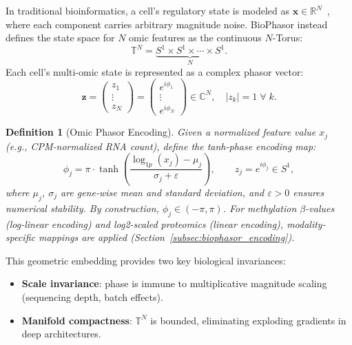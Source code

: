 \documentclass[preprint,12pt,amsmath,amssymb,superscriptaddress,floatfix]{revtex4-2}
\newcommand{\reals}{\mathbb{R}}
\newcommand{\complex}{\mathbb{C}}
\newtheorem{definition}{Definition}[section]
\newcommand{\torus}{\mathbb{T}}
\begin{document}
In traditional bioinformatics, a cell's regulatory state is modeled as
$\boldsymbol{x} \in \reals^N$~\cite{ref_051,ref_052,ref_053,ref_054,ref_055},
where each component carries arbitrary magnitude noise.
BioPhasor instead defines the state space for $N$ omic features as the
continuous $N$-Torus:
\begin{equation}
    \torus^N = \underbrace{S^1 \times S^1 \times \cdots \times S^1}_{N}.
\end{equation}
Each cell's multi-omic state is represented as a complex phasor vector:
\begin{equation}
    \boldsymbol{z} = \begin{pmatrix} z_1 \\ \vdots \\ z_N \end{pmatrix}
    = \begin{pmatrix} e^{i\phi_1} \\ \vdots \\ e^{i\phi_N} \end{pmatrix}
    \in \complex^N, \quad |z_k| = 1 \;\forall\; k.
\end{equation}

\begin{definition}[Omic Phasor Encoding]
\label{def:encoding}
Given a normalized feature value $x_j$ (e.g., CPM-normalized RNA count),
define the tanh-phase encoding map:
\begin{equation}
    \phi_j = \pi \cdot \tanh\!\left(\frac{\log_{1p}(x_j) - \mu_j}
    {\sigma_j + \varepsilon}\right),
    \qquad z_j = e^{i\phi_j} \in S^1,
\end{equation}
where $\mu_j$, $\sigma_j$ are gene-wise mean and standard deviation, and
$\varepsilon > 0$ ensures numerical stability.
By construction, $\phi_j \in (-\pi, \pi)$.
For methylation $\beta$-values (log-linear encoding) and log2-scaled
proteomics (linear encoding), modality-specific mappings are applied
(Section~\ref{subsec:biophasor_encoding}).
\end{definition}

This geometric embedding provides two key biological invariances:
\begin{itemize}
    \item \textbf{Scale invariance}: phase is immune to multiplicative
    magnitude scaling (sequencing depth, batch effects).
    \item \textbf{Manifold compactness}: $\torus^N$ is bounded, eliminating
    exploding gradients in deep architectures.
\end{itemize}
\end{document}
